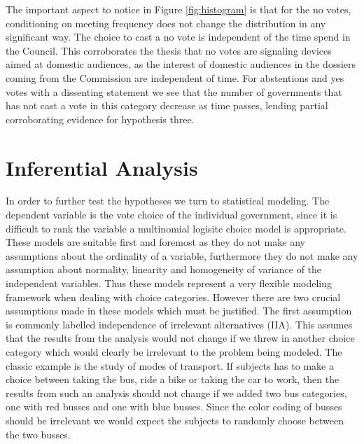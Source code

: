 The important aspect to notice in Figure \ref{fig:histogram} is that for the no votes, conditioning on meeting frequency does not change the distribution in any significant way. The choice to cast a no vote is independent of the time spend in the Council. This corroborates the thesis that no votes are signaling devices aimed at domestic audiences, as the interest of domestic audiences in the dossiers coming from the Commission are independent of time. For abstentions and yes votes with a dissenting statement we see that the number of governments that has not cast a vote in this category decrease as time passes, lending partial corroborating evidence for hypothesis three.




\section{Inferential Analysis}
In order to further test the hypotheses we turn to statistical modeling. The dependent variable is the vote choice of the individual government, since it is difficult to rank the variable a multinomial logisitc choice model is appropriate. These models are suitable first and foremost as they do not make any assumptions about the ordinality of a variable, furthermore they do not make any assumption about normality, linearity and homogeneity of variance of the independent variables. Thus these models represent a very flexible modeling framework when dealing with choice categories. However there are two crucial assumptions made in these models which must be justified. The first assumption is commonly labelled independence of irrelevant alternatives (IIA). This assumes that the results from the analysis would not change if we threw in another choice category which would clearly be irrelevant to the problem being modeled. The classic example is the study of modes of transport. If subjects has to make a choice between taking the bus, ride a bike or taking the car to work, then the results from such an analysis should not change if we added two bus categories, one with red busses and one with blue busses. Since the color coding of busses should be irrelevant we would expect the subjects to randomly choose between the two busses. 


